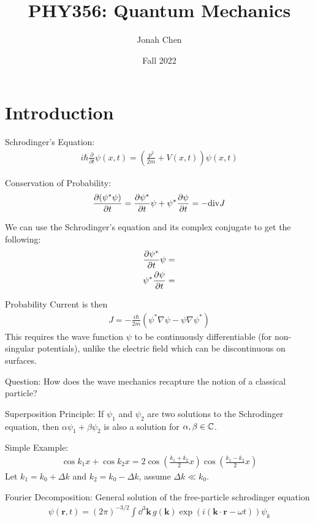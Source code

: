 \documentclass[12pt]{article}
\title{PHY356: Quantum Mechanics}
\author{Jonah Chen}
\date{Fall 2022}
\begin{document}
\maketitle
\sffamily
\section{Introduction}
Schrodinger's Equation:
\begin{align}
    i\hbar\frac{\partial}{\partial t}\psi(x, t) = \left(\frac{p^2}{2m}+V(x,t)\right)\psi(x, t)
\end{align}

Conservation of Probability:
\begin{align}
    \partialderivative{(\psi^*\psi)}{t} = \partialderivative{\psi^*}{t}\psi+\psi^*\partialderivative{\psi}{t} = -\mathrm{div} J
\end{align}

We can use the Schrodinger's equation and its complex conjugate to get the following:
\begin{align}
    \partialderivative{\psi^*}{t}\psi&=\\
    \psi^*\partialderivative{\psi}{t}&=
\end{align}

Probability Current is then 
\begin{align}
    J = -\frac{i\hbar}{2m}\left(\psi^*\nabla\psi-\psi\nabla\psi^*\right)
\end{align}
This requires the wave function $\psi$ to be continuously differentiable (for non-singular potentials), unlike the electric field which can be discontinuous on surfaces.

Question: How does the wave mechanics recapture the notion of a classical particle?

Superposition Principle: If $\psi_1$ and $\psi_2$ are two solutions to the Schrodinger equation, then $\alpha\psi_1+\beta\psi_2$ is also a solution for $\alpha, \beta\in\mathbb{C}$.

Simple Example:
\begin{align}
    \cos k_1x+\cos k_2x = 2\cos\left(\frac{k_1+k_2}{2}x\right)\cos\left(\frac{k_1-k_2}{2}x\right)
\end{align}
Let $k_1 = k_0+\Delta k$ and $k_2 = k_0-\Delta k$, assume $\Delta k\ll k_0$.

Fourier Decomposition:
General solution of the free-particle schrodinger equation
\begin{align}
    \psi(\mathbf r, t) = (2\pi)^{-3/2}\int \dd^3\mathbf k\, g(\mathbf k)\exp\left(i(\mathbf k\cdot\mathbf r-\omega t)\right)\psi_k
\end{align}
\end{document}
